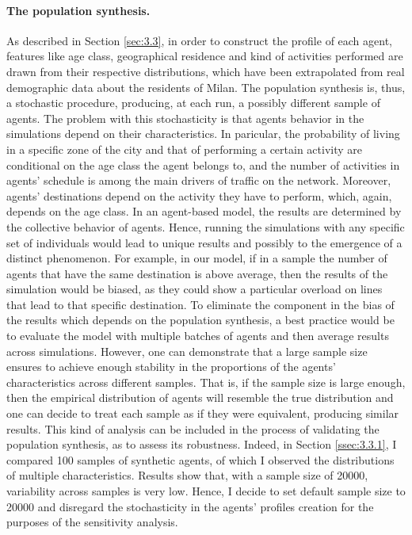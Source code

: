 \paragraph{The population synthesis.} 
As described in Section \ref{sec:3.3}, in order to construct the profile of each agent, features like age class, geographical residence and kind of activities performed are drawn from their respective distributions, which have been extrapolated from real demographic data about the residents of Milan. The population synthesis is, thus, a stochastic procedure, producing, at each run, a possibly different sample of agents. The problem with this stochasticity is that agents behavior in the simulations depend on their characteristics. In paricular, the probability of living in a specific zone of the city and that of performing a certain activity are conditional on the age class the agent belongs to, and the number of activities in agents' schedule is among the main drivers of traffic on the network. Moreover, agents' destinations depend on the activity they have to perform, which, again, depends on the age class. In an agent-based model, the results are determined by the collective behavior of agents. Hence, running the simulations with any specific set of individuals would lead to unique results and possibly to the emergence of a distinct phenomenon. For example, in our model, if in a sample the number of agents that have the same destination is above average, then the results of the simulation would be biased, as they could show a particular overload on lines that lead to that specific destination. To eliminate the component in the bias of the results which depends on the population synthesis, a best practice would be to evaluate the model with multiple batches of agents and then average results across simulations. However, one can demonstrate that a large sample size ensures to achieve enough stability in the proportions of the agents' characteristics across different samples. That is, if the sample size is large enough, then the empirical distribution of agents will resemble the true distribution and one can decide to treat each sample as if they were equivalent, producing similar results. This kind of analysis can be included in the process of validating the population synthesis, as to assess its robustness. Indeed, in Section \ref{ssec:3.3.1}, I compared 100 samples of synthetic agents, of which I observed the distributions of multiple characteristics. Results show that, with a sample size of 20000, variability across samples is very low. Hence, I decide to set default sample size to 20000 and disregard the stochasticity in the agents' profiles creation for the purposes of the sensitivity analysis.

